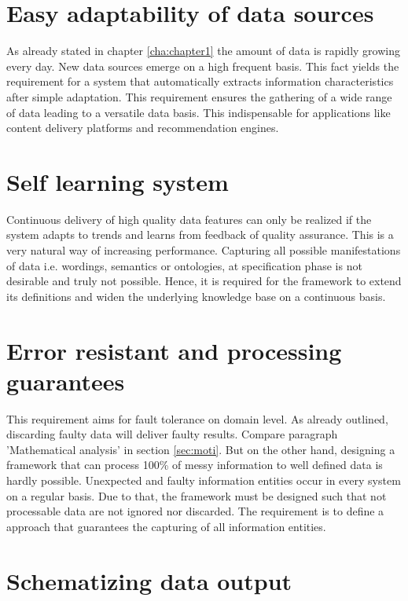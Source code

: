 \section{Easy adaptability of data sources}

As already stated in chapter \ref{cha:chapter1} the amount of data is rapidly growing every day. New data sources emerge on a high frequent basis. This fact yields the requirement for a system that automatically extracts information characteristics after simple adaptation. This requirement ensures the gathering of a wide range of data leading to a versatile data basis. This indispensable for applications like content delivery platforms and recommendation engines.

\section{Self learning system}

Continuous delivery of high quality data features can only be realized if the system adapts to trends and learns from feedback of quality assurance. This is a very natural way of increasing performance. Capturing all possible manifestations of data i.e. wordings, semantics or ontologies, at specification phase is not desirable and truly not possible. Hence, it is required for the framework to extend its definitions and widen the underlying knowledge base on a continuous basis. 

\section{Error resistant and processing guarantees \label{sec:error}}

This requirement aims for fault tolerance on domain level. As already outlined, discarding faulty data will deliver faulty results. Compare paragraph 'Mathematical analysis' in section \ref{sec:moti}. But on the other hand, designing a framework that can process 100\% of messy information to well defined data is hardly possible. Unexpected and faulty information entities occur in every system on a regular basis. Due to that, the framework must be designed such that not processable data are not ignored nor discarded. The requirement is to define a approach that guarantees the capturing of all information entities.

\section{Schematizing data output}

